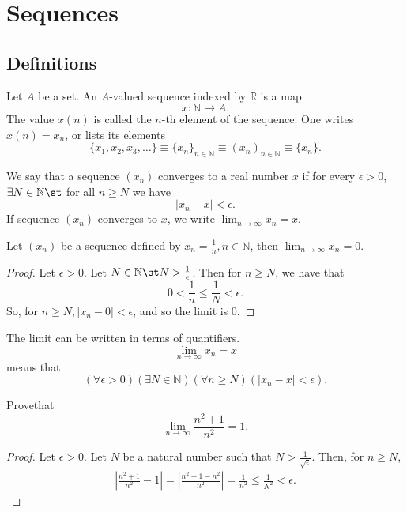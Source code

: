 \documentclass[12pt]{article}
\begin{document}
\section{Sequences}
\subsection{Definitions}
\begin{definition}
  Let $A$ be a set. An $A$-valued sequence indexed by $\mathbb{R}$ is a map \[x: \mathbb{N} \to A.\] The value $x(n)$ is called the $n$-th element of the sequence. One writes $x(n) = x_n$, or lists its elements \[\{x_1, x_2, x_3, \dots\} \equiv \{x_n\}_{n \in \mathbb{N}} \equiv (x_n)_{n \in \mathbb{N}} \equiv \{x_n\}.\]
\end{definition}

\begin{definition}[Convergence]
  We say that a sequence $(x_n)$ converges to a real number $x$ if for every $\epsilon > 0$, $\exists N \in \mathbb{N} \st$ for all $n \geq N$ we have \[|x_n - x| < \epsilon.\] If sequence $(x_n)$ converges to $x$, we write $\lim_{n \to \infty} x_n = x$.
\end{definition}

\begin{example}
  Let $(x_n)$ be a sequence defined by $x_n = \frac{1}{n}, n \in \mathbb{N}$, then $\lim_{n \to \infty} x_n = 0$.
  \begin{proof}
    Let $\epsilon > 0$. Let $N \in \mathbb{N} \st N > \frac{1}{\epsilon}$. Then for $n \geq N$, we have that $$0 < \frac{1}{n}\leq \frac{1}{N} < \epsilon.$$ So, for $n \geq N, |x_n - 0| < \epsilon$, and so the limit is $0$.
  \end{proof}
\end{example}



\begin{definition}
  The limit can be written in terms of quantifiers.
  \[\lim_{n \to \infty} x_n = x\] means that \[(\forall \epsilon > 0)(\exists N \in \mathbb{N})(\forall n \geq N)(|x_n - x| < \epsilon).\]
\end{definition}

\begin{example}
  Prove\footnotemark that $$\lim_{n\to \infty} \frac{n^2+1}{n^2} = 1.$$
\begin{proof}
  Let $\epsilon > 0$. Let $N$ be a natural number such that $N > \frac{1}{\sqrt{\epsilon}}$. Then, for $n \geq N$,
  \begin{align*}
    |\frac{n^2+1}{n^2}-1| = |\frac{n^2+1-n^2}{n^2}| = \frac{1}{n^2} \leq \frac{1}{N^2} < \epsilon.
  \end{align*}
\end{proof}
\end{example}
\end{document}
